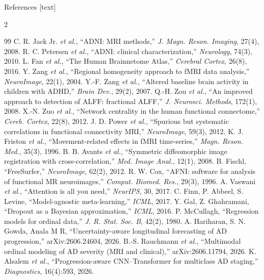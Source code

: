 \documentclass[aspectratio=169,11pt]{beamer}
\begin{document}
\begin{frame}{References}
  [text]
  \fontsize{6}{7}\selectfont
  \begin{multicols}{2}
  \begin{thebibliography}{99}
     C. R. Jack Jr. \emph{et al.}, ``ADNI: MRI methods,'' \emph{J. Magn. Reson. Imaging}, 27(4), 2008.
     R. C. Petersen \emph{et al.}, ``ADNI: clinical characterization,'' \emph{Neurology}, 74(3), 2010.
     L. Fan \emph{et al.}, ``The Human Brainnetome Atlas,'' \emph{Cerebral Cortex}, 26(8), 2016.
     Y. Zang \emph{et al.}, ``Regional homogeneity approach to fMRI data analysis,'' \emph{NeuroImage}, 22(1), 2004.
     Y.-F. Zang \emph{et al.}, ``Altered baseline brain activity in children with ADHD,'' \emph{Brain Dev.}, 29(2), 2007.
     Q.-H. Zou \emph{et al.}, ``An improved approach to detection of ALFF: fractional ALFF,'' \emph{J. Neurosci. Methods}, 172(1), 2008.
     X.-N. Zuo \emph{et al.}, ``Network centrality in the human functional connectome,'' \emph{Cereb. Cortex}, 22(8), 2012.
     J. D. Power \emph{et al.}, ``Spurious but systematic correlations in functional connectivity MRI,'' \emph{NeuroImage}, 59(3), 2012.
     K. J. Friston \emph{et al.}, ``Movement-related effects in fMRI time-series,'' \emph{Magn. Reson. Med.}, 35(3), 1996.
     B. B. Avants \emph{et al.}, ``Symmetric diffeomorphic image registration with cross-correlation,'' \emph{Med. Image Anal.}, 12(1), 2008.
     B. Fischl, ``FreeSurfer,'' \emph{NeuroImage}, 62(2), 2012.
     R. W. Cox, ``AFNI: software for analysis of functional MR neuroimages,'' \emph{Comput. Biomed. Res.}, 29(3), 1996.
     A. Vaswani \emph{et al.}, ``Attention is all you need,'' \emph{NeurIPS}, 30, 2017.
     C. Finn, P. Abbeel, S. Levine, ``Model-agnostic meta-learning,'' \emph{ICML}, 2017.
     Y. Gal, Z. Ghahramani, ``Dropout as a Bayesian approximation,'' \emph{ICML}, 2016.
     P. McCullagh, ``Regression models for ordinal data,'' \emph{J. R. Stat. Soc. B}, 42(2), 1980.
     A. Hariharan, S. N. Gowda, Anala M R, ``Uncertainty-aware longitudinal forecasting of AD progression,'' arXiv:2606.24604, 2026.
     B.-S. Rauchmann \emph{et al.}, ``Multimodal ordinal modeling of AD severity (MRI and clinical),'' arXiv:2606.11794, 2026.
     K. Alsalem \emph{et al.}, ``Progression-aware CNN--Transformer for multiclass AD staging,'' \emph{Diagnostics}, 16(4):593, 2026.
  \end{thebibliography}
  \end{multicols}
\end{frame}
\end{document}

